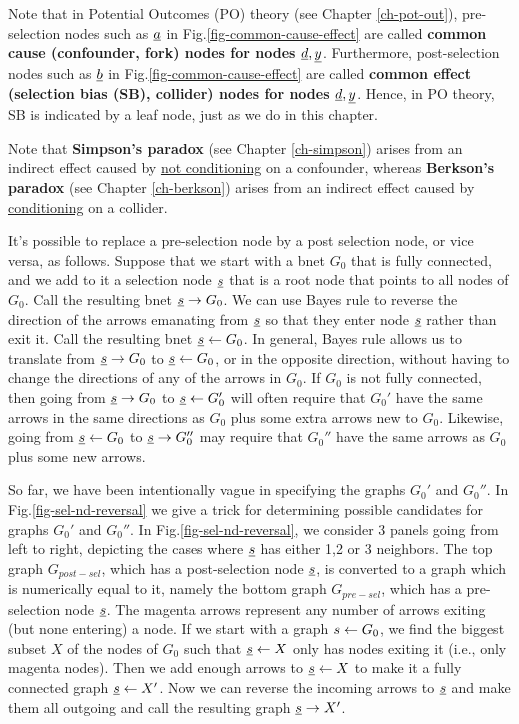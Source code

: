 Note
that in Potential
Outcomes (PO) theory
 (see Chapter \ref{ch-pot-out}),
pre-selection nodes such
as ${\underline{a}}$ in
Fig.\ref{fig-common-cause-effect}
are called {\bf common cause
 (confounder, fork) nodes
for nodes ${\underline{d}}, {\underline{y}}$}.
Furthermore, post-selection nodes such as
${\underline{b}}$ in
Fig.\ref{fig-common-cause-effect} are
called
{\bf common effect
(selection bias (SB), collider) nodes
for nodes ${\underline{d}}, {\underline{y}}$}.
Hence, in PO theory,
SB is indicated
by
a leaf node,
just as we do in this chapter.

Note that
{\bf Simpson's paradox} (see Chapter
\ref{ch-simpson}) arises from an indirect effect
caused by \ul{not conditioning}
on a confounder,
whereas
{\bf Berkson's paradox}
(see Chapter \ref{ch-berkson})
arises from an indirect effect
caused by \ul{conditioning}
on a collider.



It's possible to replace a pre-selection node
by a post selection node, or vice versa, as
follows.
Suppose that we start with
a bnet $G_0$ that is fully connected, and
we add to it a selection node ${\underline{s}}$
that is a root node that points
to all nodes of $G_0$.
Call the resulting bnet ${\underline{s}}\rightarrow G_0$.
We can use Bayes rule to reverse the direction
of the arrows emanating from ${\underline{s}}$
so that they enter node ${\underline{s}}$
rather than exit
it.
Call the resulting bnet ${\underline{s}}\leftarrow G_0$.
In general,
Bayes rule allows us to translate
from ${\underline{s}}\rightarrow G_0$ to
${\underline{s}}\leftarrow G_0$,
or in the opposite direction,
without having to change the
directions of any of the arrows in $G_0$.
If $G_0$ is not fully connected, then
going from
${\underline{s}}\rightarrow G_0$ to
${\underline{s}}\leftarrow G_0'$
will often require that $G_0'$
have the same arrows in the same
directions as $G_0$
plus some extra arrows
new to $G_0$.
Likewise, going
from
${\underline{s}}\leftarrow G_0$ to
${\underline{s}}\rightarrow G_0''$
may require that $G_0''$ have
the same arrows as $G_0$ plus some new arrows.

So far, we have
been intentionally
vague in specifying the graphs
$G_0'$ and $G_0''$.
In Fig.\ref{fig-sel-nd-reversal}
we give a trick for determining
possible candidates for
graphs $G_0'$ and $G_0''$.
In
Fig.\ref{fig-sel-nd-reversal},
we consider 3 panels going from left
to right, depicting
the cases where ${\underline{s}}$ has either 1,2 or 3 neighbors.
The top graph
 $G_{post-sel}$, which has
a post-selection node ${\underline{s}}$, is converted
to a graph which is numerically
equal to it, namely
the bottom
graph
 $G_{pre-sel}$, which has
a pre-selection node ${\underline{s}}$.
The magenta arrows represent
any number of arrows
exiting (but none entering)
a node.
If we start
with a graph $s\leftarrow G_0$,
we find the biggest subset $X$ of
the nodes of $G_0$ such
that ${\underline{s}}\leftarrow X$ only has nodes
exiting it (i.e., only magenta nodes).
Then we add enough
arrows to ${\underline{s}}\leftarrow X$
to make it a fully connected graph
${\underline{s}}\leftarrow X'$.
Now we can reverse the incoming
arrows to ${\underline{s}}$ and make them
all outgoing and call the
resulting graph ${\underline{s}}\rightarrow X'$.


